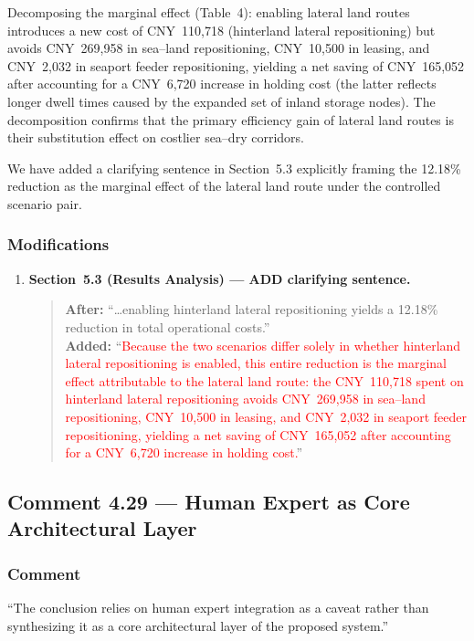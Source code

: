 \documentclass[11pt,a4paper]{article}
\begin{document}
Decomposing the marginal effect (Table~4): enabling lateral land routes introduces a new cost of CNY~110,718 (hinterland lateral repositioning) but avoids CNY~269,958 in sea--land repositioning, CNY~10,500 in leasing, and CNY~2,032 in seaport feeder repositioning, yielding a net saving of CNY~165,052 after accounting for a CNY~6,720 increase in holding cost (the latter reflects longer dwell times caused by the expanded set of inland storage nodes). The decomposition confirms that the primary efficiency gain of lateral land routes is their substitution effect on costlier sea--dry corridors.

We have added a clarifying sentence in Section~5.3 explicitly framing the 12.18\% reduction as the marginal effect of the lateral land route under the controlled scenario pair.

\subsubsection{Modifications}
\begin{enumerate}
\item \textbf{Section~5.3 (Results Analysis) --- ADD clarifying sentence.}
\begin{quote}
\textbf{After:} ``\ldots enabling hinterland lateral repositioning yields a 12.18\% reduction in total operational costs.''\\[4pt]
\textbf{Added:} ``\textcolor{red}{Because the two scenarios differ solely in whether hinterland lateral repositioning is enabled, this entire reduction is the marginal effect attributable to the lateral land route: the CNY~110,718 spent on hinterland lateral repositioning avoids CNY~269,958 in sea--land repositioning, CNY~10,500 in leasing, and CNY~2,032 in seaport feeder repositioning, yielding a net saving of CNY~165,052 after accounting for a CNY~6,720 increase in holding cost.}''
\end{quote}
\end{enumerate}

\subsection{Comment 4.29 --- Human Expert as Core Architectural Layer}

\subsubsection{Comment}
``The conclusion relies on human expert integration as a caveat rather than synthesizing it as a core architectural layer of the proposed system.''
\end{document}
